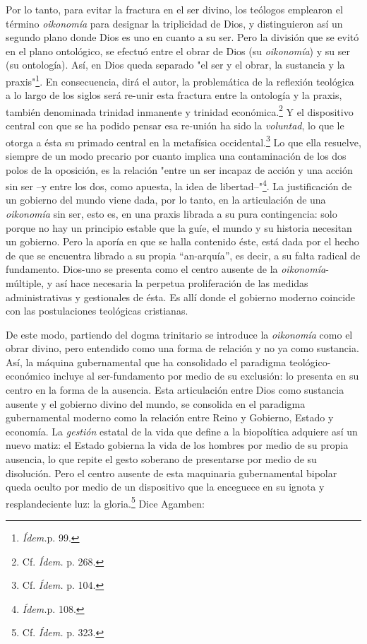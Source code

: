 \documentclass{book}
\begin{document}
Por lo tanto, para evitar la fractura en el ser divino, los teólogos
emplearon el término \emph{oikonomía} para designar la triplicidad de
Dios, y distinguieron así un segundo plano donde Dios es uno en cuanto a
su ser. Pero la división que se evitó en el plano ontológico, se efectuó
entre el obrar de Dios (su \emph{oikonomía}) y su ser (su ontología).
Así, en Dios queda separado "el ser y el obrar, la sustancia y la
praxis"\footnote{\emph{Ídem.}p. 99.}. En consecuencia, dirá el autor, la
problemática de la reflexión teológica a lo largo de los siglos será
re-unir esta fractura entre la ontología y la praxis, también denominada
trinidad inmanente y trinidad económica.\footnote{Cf. \emph{Ídem.} p.
  268.} Y el dispositivo central con que se ha podido pensar esa
re-unión ha sido la \emph{voluntad}, lo que le otorga a ésta su primado
central en la metafísica occidental.\footnote{Cf. \emph{Ídem.} p. 104.}
Lo que ella resuelve, siempre de un modo precario por cuanto implica una
contaminación de los dos polos de la oposición, es la relación "entre un
ser incapaz de acción y una acción sin ser --y entre los dos, como
apuesta, la idea de libertad--"\footnote{\emph{Ídem.}p. 108.}. La
justificación de un gobierno del mundo viene dada, por lo tanto, en la
articulación de una \emph{oikonomía} sin ser, esto es, en una praxis
librada a su pura contingencia: solo porque no hay un principio estable
que la guíe, el mundo y su historia necesitan un gobierno. Pero la
aporía en que se halla contenido éste, está dada por el hecho de que se
encuentra librado a su propia ``an-arquía'', es decir, a su falta
radical de fundamento. Dios-uno se presenta como el centro ausente de la
\emph{oikonomía}-múltiple, y así hace necesaria la perpetua
proliferación de las medidas administrativas y gestionales de ésta. Es
allí donde el gobierno moderno coincide con las postulaciones teológicas
cristianas.

De este modo, partiendo del dogma trinitario se introduce la
\emph{oikonomía} como el obrar divino, pero entendido como una forma de
relación y no ya como sustancia. Así, la máquina gubernamental que ha
consolidado el paradigma teológico-económico incluye al ser-fundamento
por medio de su exclusión: lo presenta en su centro en la forma de la
ausencia. Esta articulación entre Dios como sustancia ausente y el
gobierno divino del mundo, se consolida en el paradigma gubernamental
moderno como la relación entre Reino y Gobierno, Estado y economía. La
\emph{gestión} estatal de la vida que define a la biopolítica adquiere
así un nuevo matiz: el Estado gobierna la vida de los hombres por medio
de su propia ausencia, lo que repite el gesto soberano de presentarse
por medio de su disolución. Pero el centro ausente de esta maquinaria
gubernamental bipolar queda oculto por medio de un dispositivo que la
enceguece en su ignota y resplandeciente luz: la gloria.\footnote{Cf.
  \emph{Ídem.} p. 323.} Dice Agamben:
\end{document}
